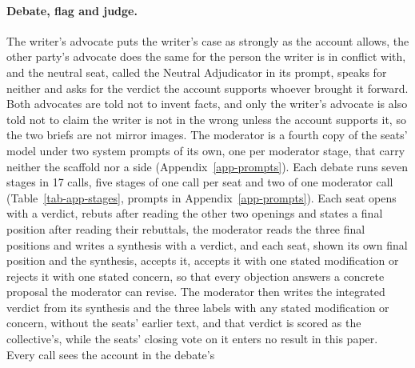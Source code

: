 \paragraph{Debate, flag and judge.}
The writer's advocate puts the writer's case as strongly as the account
allows, the other party's advocate does the same for the person the writer is
in conflict with, and the neutral seat, called the Neutral Adjudicator in its
prompt, speaks for neither and asks for the verdict the account supports
whoever brought it forward.
Both advocates
are told not to invent facts, and only the writer's advocate is also told not
to claim the writer is not in the wrong unless the account supports it, so the
two briefs are not mirror images. The moderator is a fourth copy of the
seats' model under two system prompts of its own, one per moderator stage,
that carry neither the scaffold nor a side (Appendix~\ref{app-prompts}).
Each debate runs seven stages in 17 calls,
five stages of one call per seat and two of one moderator call
(Table~\ref{tab-app-stages}, prompts in Appendix~\ref{app-prompts}). Each seat
opens with a verdict, rebuts after reading the other two openings and states a
final position after reading their rebuttals, the moderator reads the three
final positions and writes a synthesis with a verdict, and each seat, shown
its own final position and the synthesis, accepts it, accepts it with one
stated modification or rejects it with one stated concern, so that every
objection answers a concrete proposal the moderator can revise. The moderator
then writes the integrated verdict from its synthesis and the three labels
with any stated modification or concern, without the seats' earlier text, and
that verdict is scored as the collective's, while the seats' closing vote on
it enters no result in this paper. Every call sees the account in the debate's
